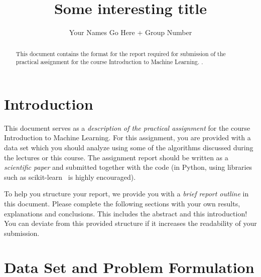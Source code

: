 \documentclass[runningheads]{llncs}
\begin{document}
%
\title{Some interesting title}
%
%
\author{Your Names Go Here + Group Number}
%
%
%
\maketitle %
%
\begin{abstract}
This document contains the format for the report required for submission of the practical assignment for the course Introduction to Machine Learning. . 
\end{abstract}


\section{Introduction}
This document serves as a \textit{description of the practical assignment} for the course Introduction to Machine Learning. For this assignment, you are provided with a data set which you should analyze using some of the algorithms discussed during the lectures or this course. The assignment report should be written as a \textit{scientific paper} and submitted together with the code (in Python, using libraries such as scikit-learn~\cite{scikit-learn} is highly encouraged). 

To help you structure your report, we provide you with a \textit{brief report outline} in this document. Please complete the following sections with your own results, explanations and conclusions. This includes the abstract and this introduction! You can deviate from this provided structure if it increases the readability of your submission. 

\section{Data Set and Problem Formulation} \label{sect:dataset}
\end{document}
